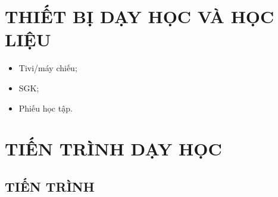 \section{THIẾT BỊ DẠY HỌC VÀ HỌC LIỆU}
\begin{itemize}
	\item Tivi/máy chiếu;
	\item SGK;
	\item Phiếu học tập.
\end{itemize}
\section{TIẾN TRÌNH DẠY HỌC}
\subsection{TIẾN TRÌNH}\newpage
